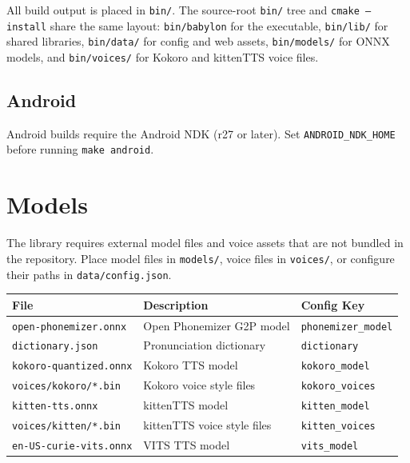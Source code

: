 \documentclass[12pt,a4paper]{article}
\begin{document}
All build output is placed in \texttt{bin/}. The source-root \texttt{bin/} tree and \texttt{cmake --install} share the same layout: \texttt{bin/babylon} for the executable, \texttt{bin/lib/} for shared libraries, \texttt{bin/data/} for config and web assets, \texttt{bin/models/} for ONNX models, and \texttt{bin/voices/} for Kokoro and kittenTTS voice files.

\subsection{Android}

Android builds require the Android NDK (r27 or later). Set \texttt{ANDROID\_NDK\_HOME} before running \texttt{make android}.

\section{Models}
\label{sec:models}

The library requires external model files and voice assets that are not bundled in the repository. Place model files in \texttt{models/}, voice files in \texttt{voices/}, or configure their paths in \texttt{data/config.json}.

\begin{center}
\begin{tabular}{lll}
\toprule
\textbf{File} & \textbf{Description} & \textbf{Config Key} \\
\midrule
\texttt{open-phonemizer.onnx}  & Open Phonemizer G2P model & \texttt{phonemizer\_model} \\
\texttt{dictionary.json}       & Pronunciation dictionary  & \texttt{dictionary} \\
\texttt{kokoro-quantized.onnx} & Kokoro TTS model          & \texttt{kokoro\_model} \\
\texttt{voices/kokoro/*.bin}          & Kokoro voice style files  & \texttt{kokoro\_voices} \\
\texttt{kitten-tts.onnx}      & kittenTTS model           & \texttt{kitten\_model} \\
\texttt{voices/kitten/*.bin}  & kittenTTS voice style files & \texttt{kitten\_voices} \\
\texttt{en-US-curie-vits.onnx} & VITS TTS model            & \texttt{vits\_model} \\
\bottomrule
\end{tabular}
\end{center}
\end{document}
